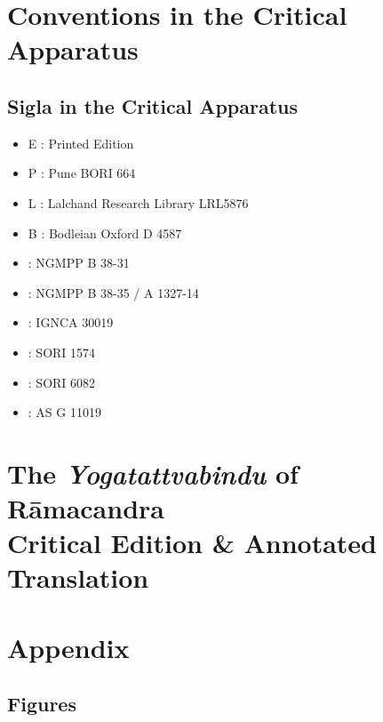 \mainmatter

\chapter{Conventions in the Critical Apparatus}
\section{Sigla in the Critical Apparatus}

\begin{itemize}
\item E : Printed Edition
\item P : Pune BORI 664
\item L : Lalchand Research Library LRL5876
\item B : Bodleian Oxford D 4587
\item \None : NGMPP B 38-31
\item \Ntwo : NGMPP B 38-35 / A 1327-14
\item \Done : IGNCA 30019
\item \Uone : SORI 1574
\item \Utwo : SORI 6082
\item \Kone : AS G 11019
\end{itemize}

\chapter[Critical Edition \& Annotated Translation of the \emph{Yogatattvabindu}]{The \emph{Yogatattvabindu} of Rāmacandra \\ \huge  
Critical Edition \& Annotated Translation}
\pagestyle{chapter2style}
\cleardoublepage

\chapter{Appendix}
\section{Figures}

\clearpage

